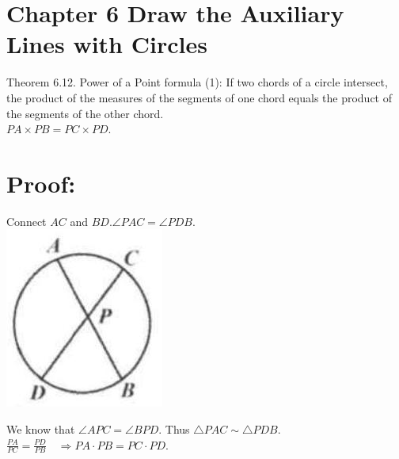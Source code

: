 \documentclass[10pt]{article}
\begin{document}
\section*{Chapter 6 Draw the Auxiliary Lines with Circles}
Theorem 6.12. Power of a Point formula (1): If two chords of a circle intersect, the product of the measures of the segments of one chord equals the product of the segments of the other chord.\\
\(P A \times P B=P C \times P D\).

\section*{Proof:}
Connect \(A C\) and \(B D . \angle P A C=\angle P D B\).\\
\includegraphics[max width=\textwidth, center]{2025_04_17_97bc1f7e44d93c271a88g-192}

We know that \(\angle A P C=\angle B P D\). Thus \(\triangle P A C \sim \triangle P D B\).\\
\(\frac{P A}{P C}=\frac{P D}{P B} \quad \Rightarrow P A \cdot P B=P C \cdot P D\).
\end{document}
